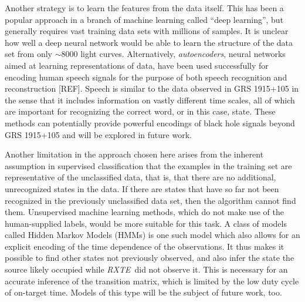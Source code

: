\documentclass[12pt]{emulateapj}
\newcommand{\project}[1]{\textsl{#1}}
\newcommand{\rxte}{\project{RXTE}}
\begin{document}
Another strategy is to learn the features from the data itself. This has been a popular approach in a branch of machine learning called ``deep learning'', but generally 
requires vast training data sets with millions of samples. It is unclear how well a deep neural network would be able to learn the structure of the data set from only 
$\sim 8000$ light curves. Alternatively, \textit{autoencoders}, neural networks aimed at learning representations of data, have been used successfully for encoding 
human speech signals for the purpose of both speech recognition and reconstruction [REF]. Speech is similar to the data observed in GRS 1915+105 in the sense 
that it includes information on vastly different time scales, all of which are important for recognizing the correct word, or in this case, state. These methods can 
potentially provide powerful encodings of black hole signals beyond GRS 1915+105 and will be explored in future work. 

Another limitation in the approach chosen here arises from the inherent assumption in supervised classification that the examples in the training set are representative 
of the unclassified data, that is, that there are no additional, unrecognized states in the data. If there are states that have so far not been 
recognized in the previously unclassified data set, then the algorithm cannot find them. Unsupervised machine learning methods, which do not make 
use of the human-supplied labels, would be more suitable for this task. A class of models called Hidden Markov Models (HMMs) is one such model which also 
allows for an explicit encoding of the time dependence of the observations. It thus makes it possible to find other states not previously observed, and also infer 
the state the source likely occupied while \rxte\ did not observe it. This is necessary for an accurate inference of the transition matrix, which is limited by the 
low duty cycle of on-target time. Models of this type will be the subject of future work, too.
\end{document}
